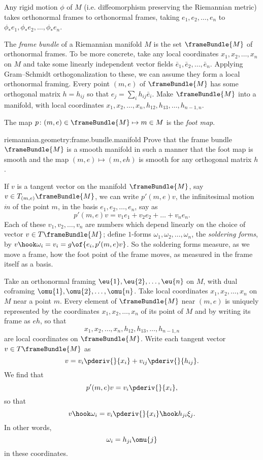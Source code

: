 Any rigid motion \(\phi\) of \(M\) (i.e. diffeomorphism preserving the Riemannian metric) takes orthonormal frames to orthonormal frames, taking \(e_1, e_2, \dots, e_n\) to \(\phi_* e_1, \phi_* e_2, \dots, \phi_* e_n\).

The \emph{frame bundle} of a Riemannian manifold \(M\) is the set \(\frameBundle{M}\) of orthonormal frames.
To be more concrete, take any local coordinates \(x_1, x_2, \dots, x_n\) on \(M\) and take some linearly independent vector fields \(\bar{e}_1, \bar{e}_2, \dots, \bar{e}_n\).
Applying Gram--Schmidt orthogonalization to these, we can assume they form a local orthonormal framing.
Every point \((m,e)\) of \(\frameBundle{M}\) has some orthogonal matrix \(h=h_{ij}\) so that \(e_j=\sum_i h_{ij} \bar{e}_i\).
Make \(\frameBundle{M}\) into a manifold, with local coordinates \(x_1, x_2, \dots, x_n, h_{12}, h_{13}, \dots, h_{n-1,n}\).

The map \(p \colon (m,e) \in \frameBundle{M} \mapsto m \in M\) is the \emph{foot map}.
\begin{problem}{riemannian.geometry:frame.bundle.manifold}
Prove that the frame bundle \(\frameBundle{M}\) is a smooth manifold in such a manner that the foot map is smooth and the map \((m,e) \mapsto (m,eh)\) is smooth for any orthogonal matrix \(h\).
\end{problem}
If \(v\) is a tangent vector on the manifold \(\frameBundle{M}\), say \(v \in T_{(m,e)} \frameBundle{M}\), we can write \(p'(m,e) v\), the infinitesimal motion \(\dot{m}\) of the point \(m\), in the basis \(e_1, e_2, \dots, e_n\), say as
\[
p'(m,e)v = v_1 e_1 + v_2 e_2 + \dots + v_n e_n.
\]
Each of these \(v_1, v_2, \dots, v_n\) are numbers which depend linearly on the choice of vector \(v \in T\frameBundle{M}\); define \(1\)-forms \(\omega_1, \omega_2, \dots, \omega_n\), the \emph{soldering forms}, by \(v \hook \omega_i = v_i = g\of{e_i,p'(m,e)v}\).
So the soldering forms measure, as we move a frame, how the foot point of the frame moves, as measured in the frame itself as a basis.

Take an orthonormal framing \(\eu{1}, \eu{2}, \dots, \eu{n}\) on \(M\), with dual coframing \(\omu{1}, \omu{2}, \dots, \omu{n}\).
Take local coordinates \(x_1, x_2, \dots, x_n\) on \(M\) near a point \(m\).
Every element of \(\frameBundle{M}\) near \((m,e)\) is uniquely represented by the coordinates \(x_1, x_2, \dots, x_n\) of its point of \(M\) and by writing its frame as \(eh\), so that 
\[
x_1, x_2, \dots, x_n, h_{12}, h_{13}, \dots, h_{n-1,n}
\]
are local coordinates on \(\frameBundle{M}\).
Write each tangent vector \(v \in T\frameBundle{M}\) as 
\[
v = v_i \pderiv{}{x_i} + v_{ij} \pderiv{}{h_{ij}}.
\]
We find that
\[
p'(m,e)v=v_i \pderiv{}{x_i},
\]
so that
\[
v \hook \omega_i=v_i \pderiv{}{x_i} \hook h_{ji}\xi_j.
\]
In other words, 
\[
\omega_i = h_{ji} \omu{j}
\]
in these coordinates.

